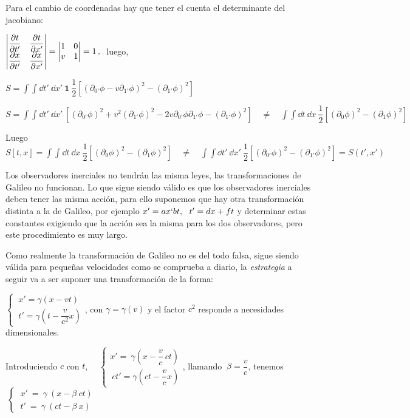 Para el cambio de coordenadas hay que tener el cuenta el determinante del jacobiano:

$\mqty| \displaystyle \pdv{t}{t'} & \displaystyle \pdv{t}{x'} \\ \displaystyle \pdv{x}{t'} & \displaystyle \pdv{x}{x'} | = \mqty| 1 & 0 \\ v & 1 |= 1\, , \ $ luego,

$\displaystyle S=\int \int \dd t' \ \dd x' \ \boldsymbol 1 \ \dfrac 1 2 \left[ (\partial_{0'} \phi - v \partial_{1'} \phi )^2 - (\partial_{1'} \phi)^2 \right]$

$S=\displaystyle
\int \int \dd t' \ \dd x' \  \left[ 
(\partial_{0'} \phi)^2 +v^2 (\partial_{1'} \phi)^2 - 2v \partial_{0'} \phi \partial_{1'} \phi  - (\partial_{1'} \phi)^2 \right]
\quad \boldsymbol{\neq} \quad   
\int \int \dd t \ \dd x \ \dfrac 1 2 \left[ (\partial_0 \phi)^2 - (\partial_1 \phi)^2 \right] $

Luego $\displaystyle
S[t,x]=\int \int \dd t \ \dd x \ \dfrac 1 2 \left[ (\partial_0 \phi)^2 - (\partial_1 \phi)^2 \right]
\quad \boldsymbol{\neq} \quad 
\int \int \dd t' \ \dd x' \ \dfrac 1 2 \left[ ( \partial_{0'} \phi)^2-(\partial_{1'} \phi)^2 \right] =  S(t',x')$

Los observadores inerciales no tendrán las misma leyes, las transformaciones de Galileo no funcionan. Lo que sigue siendo válido es que los observadores inerciales deben tener las misma acción, para ello suponemos que hay otra transformación distinta a la de Galileo, por ejemplo $x'=ax`bt,\ \ t'=dx+ft$ y determinar estas constantes exigiendo que la acción sea la misma para los dos observadores, pero este procedimiento es muy largo.

Como realmente la transformación de Galileo no es del todo falsa, sigue siendo válida para pequeñas velocidades como se comprueba a diario, la \emph{estrategia} a seguir va a ser suponer una transformación de la forma:

$\begin{cases}
\ x'=\gamma(x-vt) \\ \ t'=\gamma \left(t-\dfrac v{c^2} x	 \right)
\end{cases}$, con $\gamma=\gamma(v)$ y el factor $c^2$ responde a necesidades dimensionales.
 
Introduciendo $c$ con $t$, $\quad \begin{cases}
 x'=\ \gamma \left( x-\dfrac v c \ ct \right) \\ \ 	ct'=\gamma \left( ct-\dfrac v{c} x \right)
 \end{cases}$, llamando $\ \beta =\dfrac v c $, tenemos
 $\ \begin{cases}
\ x' \ = \ \gamma \ (x-\beta \ c t )	 \\ \ t' \ = \ \gamma \ (ct - \beta \ x)
\end{cases}$

